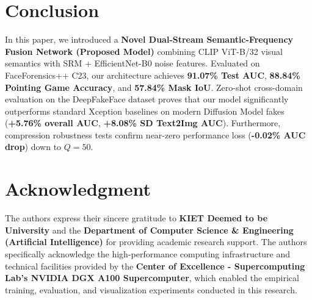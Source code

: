 \documentclass[10pt,conference]{IEEEtran}
\begin{document}
\section{Conclusion}\label{sec:conclusion}
In this paper, we introduced a \textbf{Novel Dual-Stream Semantic-Frequency Fusion Network (Proposed Model)} combining CLIP ViT-B/32 visual semantics with SRM + EfficientNet-B0 noise features. Evaluated on FaceForensics++ C23, our architecture achieves \textbf{91.07\% Test AUC}, \textbf{88.84\% Pointing Game Accuracy}, and \textbf{57.84\% Mask IoU}. Zero-shot cross-domain evaluation on the DeepFakeFace dataset proves that our model significantly outperforms standard Xception baselines on modern Diffusion Model fakes (\textbf{+5.76\% overall AUC}, \textbf{+8.08\% SD Text2Img AUC}). Furthermore, compression robustness tests confirm near-zero performance loss (\textbf{-0.02\% AUC drop}) down to $Q=50$.

\section*{Acknowledgment}
The authors express their sincere gratitude to \textbf{KIET Deemed to be University} and the \textbf{Department of Computer Science \& Engineering (Artificial Intelligence)} for providing academic research support. The authors specifically acknowledge the high-performance computing infrastructure and technical facilities provided by the \textbf{Center of Excellence - Supercomputing Lab's NVIDIA DGX A100 Supercomputer}, which enabled the empirical training, evaluation, and visualization experiments conducted in this research.



\end{document}
